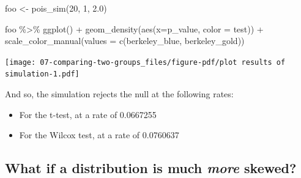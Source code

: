 \documentclass[
  letterpaper,
  DIV=11,
  numbers=noendperiod]{scrreprt}
\newenvironment{Shaded}{\begin{snugshade}}{\end{snugshade}}
\newcommand{\AttributeTok}[1]{\textcolor[rgb]{0.40,0.45,0.13}{#1}}
\newcommand{\DecValTok}[1]{\textcolor[rgb]{0.68,0.00,0.00}{#1}}
\newcommand{\FloatTok}[1]{\textcolor[rgb]{0.68,0.00,0.00}{#1}}
\newcommand{\FunctionTok}[1]{\textcolor[rgb]{0.28,0.35,0.67}{#1}}
\newcommand{\NormalTok}[1]{\textcolor[rgb]{0.00,0.23,0.31}{#1}}
\newcommand{\OtherTok}[1]{\textcolor[rgb]{0.00,0.23,0.31}{#1}}
\newcommand{\SpecialCharTok}[1]{\textcolor[rgb]{0.37,0.37,0.37}{#1}}
\providecommand{\tightlist}{%
  \setlength{\itemsep}{0pt}\setlength{\parskip}{0pt}}\usepackage{longtable,booktabs,array}
\begin{document}
\begin{Shaded}
\begin{Highlighting}[]
\NormalTok{foo }\OtherTok{\textless{}{-}} \FunctionTok{pois\_sim}\NormalTok{(}\DecValTok{20}\NormalTok{, }\DecValTok{1}\NormalTok{, }\FloatTok{2.0}\NormalTok{)}
\end{Highlighting}
\end{Shaded}

\begin{Shaded}
\begin{Highlighting}[]
\NormalTok{foo }\SpecialCharTok{\%\textgreater{}\%}
  \FunctionTok{ggplot}\NormalTok{() }\SpecialCharTok{+}
  \FunctionTok{geom\_density}\NormalTok{(}\FunctionTok{aes}\NormalTok{(}\AttributeTok{x=}\NormalTok{p\_value, }\AttributeTok{color =}\NormalTok{ test)) }\SpecialCharTok{+}
  \FunctionTok{scale\_color\_manual}\NormalTok{(}\AttributeTok{values =} \FunctionTok{c}\NormalTok{(berkeley\_blue, berkeley\_gold))}
\end{Highlighting}
\end{Shaded}

\texttt{[image: 07-comparing-two-groups\_files/figure-pdf/plot results of simulation-1.pdf]}

And so, the simulation rejects the null at the following rates:

\begin{itemize}
\tightlist
\item
  For the t-test, at a rate of 0.0667255
\item
  For the Wilcox test, at a rate of 0.0760637
\end{itemize}

\subsection{\texorpdfstring{What if a distribution is much \emph{more}
skewed?}{What if a distribution is much more skewed?}}\label{what-if-a-distribution-is-much-more-skewed}
\end{document}
